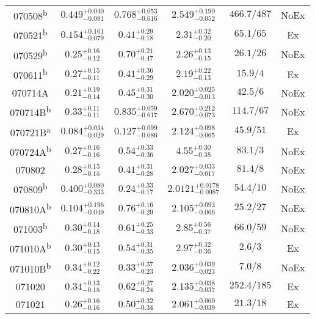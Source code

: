\begin{center}
\begin{longtable}{cccccc}
070508\textsuperscript{b} & $0.449^{+0.040}_{-0.081}$ & $0.768^{+0.053}_{-0.616}$ & $2.549^{+0.190}_{-0.052}$ & $466.7/487$ & NoEx\\[2pt] 
070521\textsuperscript{b} & $0.154^{+0.161}_{-0.079}$ & $0.41^{+0.29}_{-0.18}$ & $2.31^{+0.32}_{-0.20}$ & $65.1/65$ & Ex\\[2pt] 
070529\textsuperscript{b} & $0.25^{+0.16}_{-0.12}$ & $0.70^{+0.21}_{-0.47}$ & $2.26^{+0.13}_{-0.15}$ & $26.1/26$ & NoEx\\[2pt] 
070611\textsuperscript{b} & $0.27^{+0.15}_{-0.11}$ & $0.41^{+0.36}_{-0.29}$ & $2.19^{+0.22}_{-0.13}$ & $15.9/4$ & Ex\\[2pt] 
070714A & $0.21^{+0.19}_{-0.14}$ & $0.45^{+0.31}_{-0.30}$ & $2.020^{+0.025}_{-0.013}$ & $42.5/6$ & NoEx\\[2pt] 
070714B\textsuperscript{b} & $0.33^{+0.11}_{-0.11}$ & $0.835^{+0.059}_{-0.617}$ & $2.670^{+0.212}_{-0.073}$ & $114.7/67$ & NoEx\\[2pt] 
070721B\textsuperscript{a} & $0.084^{+0.034}_{-0.029}$ & $0.127^{+0.099}_{-0.086}$ & $2.124^{+0.098}_{-0.065}$ & $45.9/51$ & Ex\\[2pt] 
070724A\textsuperscript{b} & $0.27^{+0.16}_{-0.16}$ & $0.54^{+0.33}_{-0.36}$ & $4.55^{+0.30}_{-0.38}$ & $83.1/3$ & NoEx\\[2pt] 
070802 & $0.28^{+0.15}_{-0.15}$ & $0.41^{+0.31}_{-0.28}$ & $2.027^{+0.033}_{-0.017}$ & $81.4/8$ & NoEx\\[2pt] 
070809\textsuperscript{b} & $0.400^{+0.080}_{-0.333}$ & $0.24^{+0.33}_{-0.17}$ & $2.0121^{+0.0178}_{-0.0087}$ & $54.4/10$ & NoEx\\[2pt] 
070810A\textsuperscript{b} & $0.104^{+0.196}_{-0.049}$ & $0.76^{+0.16}_{-0.29}$ & $2.105^{+0.093}_{-0.066}$ & $25.2/27$ & NoEx\\[2pt] 
071003\textsuperscript{b} & $0.30^{+0.14}_{-0.18}$ & $0.61^{+0.25}_{-0.33}$ & $2.85^{+0.56}_{-0.37}$ & $66.0/59$ & NoEx\\[2pt] 
071010A\textsuperscript{b} & $0.30^{+0.13}_{-0.15}$ & $0.54^{+0.31}_{-0.35}$ & $2.97^{+0.32}_{-0.36}$ & $2.6/3$ & Ex\\[2pt] 
071010B\textsuperscript{b} & $0.34^{+0.12}_{-0.22}$ & $0.33^{+0.37}_{-0.23}$ & $2.036^{+0.039}_{-0.023}$ & $7.0/8$ & NoEx\\[2pt] 
071020 & $0.34^{+0.13}_{-0.15}$ & $0.62^{+0.27}_{-0.24}$ & $2.135^{+0.038}_{-0.037}$ & $252.4/185$ & Ex\\[2pt] 
071021 & $0.26^{+0.16}_{-0.16}$ & $0.50^{+0.32}_{-0.34}$ & $2.061^{+0.060}_{-0.039}$ & $21.3/18$ & Ex\\[2pt] 

\end{longtable}
\end{center}
